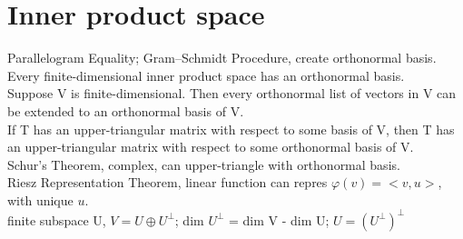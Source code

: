 \documentclass[paper=a4, fontsize=11pt]{scrartcl} %
\numberwithin{equation}{section} %
\numberwithin{figure}{section} %
\numberwithin{table}{section} %
\begin{document}
\section{Inner product space}
Parallelogram Equality; Gram–Schmidt Procedure, create orthonormal basis.\\
Every finite-dimensional inner product space has an orthonormal basis.\\
Suppose V is finite-dimensional. Then every orthonormal list of vectors in V can be extended to an orthonormal basis of V.\\
If T has an upper-triangular matrix with respect to some basis of V, then T has an upper-triangular matrix with respect to some orthonormal basis of V.\\
Schur’s Theorem, complex, can upper-triangle with orthonormal basis.\\
Riesz Representation Theorem, linear function can repres $\varphi(v)=<v,u>$, with unique $u$.\\
finite subspace U, $V=U\oplus U^\bot$; dim $U^\bot$ = dim V - dim U; $U=(U^\bot)^\bot$
\end{document}
